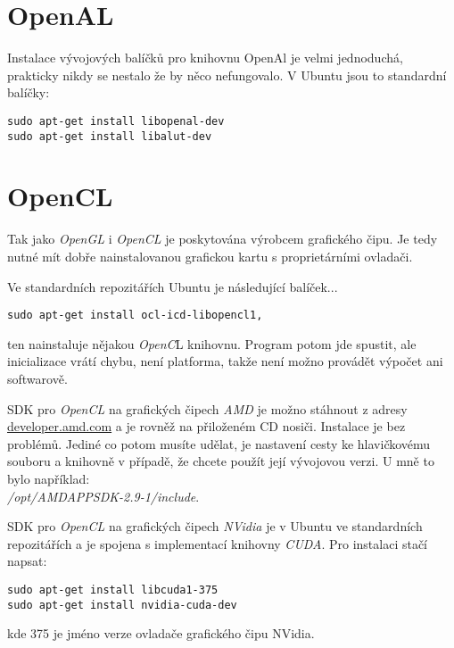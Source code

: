\section{OpenAL}

Instalace vývojových balíčků pro knihovnu OpenAl je velmi jednoduchá, prakticky nikdy se nestalo že by něco nefungovalo. V Ubuntu jsou to standardní balíčky:

\begin{Verbatim} 
sudo apt-get install libopenal-dev
sudo apt-get install libalut-dev
\end{Verbatim}

\section{OpenCL}

Tak jako \emph{OpenGL} i \emph{OpenCL} je poskytována výrobcem grafického čipu. Je tedy nutné 
mít dobře nainstalovanou grafickou kartu s proprietárními ovladači.

Ve standardních repozitářích Ubuntu je následující balíček...

\begin{Verbatim} 
sudo apt-get install ocl-icd-libopencl1,
\end{Verbatim}

ten nainstaluje nějakou \emph{OpenC}L knihovnu. Program potom jde spustit, ale inicializace vrátí chybu, není platforma, takže není možno provádět výpočet ani softwarově.


SDK pro \emph{OpenCL} na grafických čipech \emph{AMD} je možno stáhnout z adresy \href{http://developer.amd.com/tools-and-sdks/opencl-zone/amd-accelerated-parallel-processing-app-sdk/}{developer.amd.com} a je rovněž na přiloženém CD nosiči. Instalace je bez problémů.
Jediné co potom musíte udělat, je nastavení cesty ke hlavičkovému souboru a knihovně v případě, že chcete použít její vývojovou verzi. U mně to bylo například:\\
\emph{/opt/AMDAPPSDK-2.9-1/include}.


SDK pro \emph{OpenCL} na grafických čipech \emph{NVidia} je v Ubuntu ve standardních repozitářích a
je spojena s implementací knihovny \emph{CUDA}. Pro instalaci stačí napsat:

\begin{Verbatim} 
sudo apt-get install libcuda1-375
sudo apt-get install nvidia-cuda-dev
\end{Verbatim}
kde 375 je jméno verze ovladače grafického čipu NVidia.
